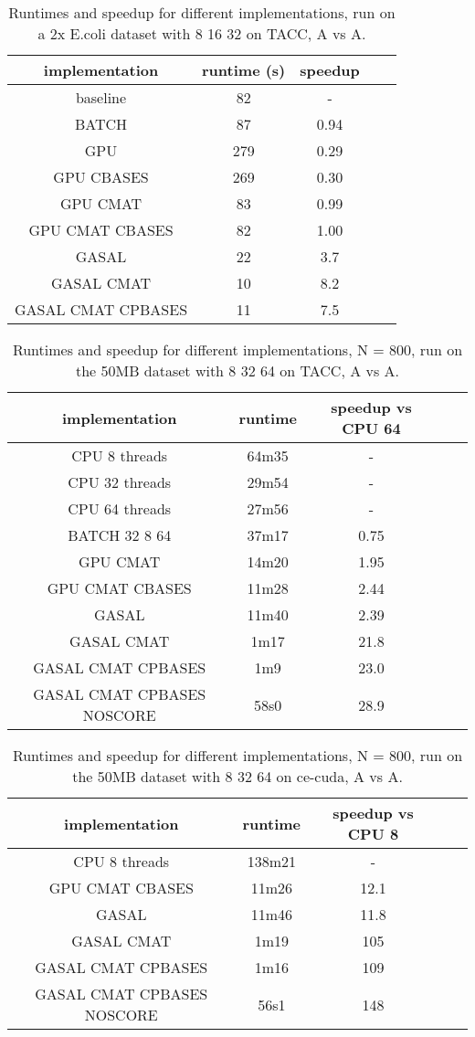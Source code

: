 \documentclass[../main/thesis.tex]{subfiles}
\begin{document}
\begin{table}
\centering
\caption{Runtimes and speedup for different implementations, run on a 2x E.coli dataset with 8 16 32 on TACC, A vs A.}
\label{tbl:darwin1}
\begin{tabular}{c c c c c}
implementation & runtime (s) & speedup \\ \hline
baseline & 82 & -\\
BATCH & 87 & 0.94 \\
GPU & 279 & 0.29 \\
GPU CBASES & 269 & 0.30 \\
GPU CMAT & 83 & 0.99 \\
GPU CMAT CBASES & 82 & 1.00 \\
GASAL & 22 & 3.7 \\
GASAL CMAT & 10 & 8.2 \\
GASAL CMAT CPBASES & 11 & 7.5 \\
\end{tabular}
\end{table}

\begin{table}
\centering
\caption{Runtimes and speedup for different implementations, N = 800, run on the 50MB dataset with 8 32 64 on TACC, A vs A.}
\label{tbl:darwin2}
\begin{tabular}{c c c c c}
implementation & runtime & speedup vs CPU 64 \\ \hline
CPU 8 threads & 64m35 & - \\
CPU 32 threads & 29m54 & - \\
CPU 64 threads & 27m56 & - \\
BATCH 32 8 64 & 37m17 & 0.75 \\
GPU CMAT & 14m20 & 1.95 \\
GPU CMAT CBASES & 11m28 & 2.44 \\
GASAL & 11m40 & 2.39 \\
GASAL CMAT & 1m17 & 21.8 \\
GASAL CMAT CPBASES & 1m9 & 23.0 \\
GASAL CMAT CPBASES NOSCORE & 58s0 & 28.9 \\
\end{tabular}
\end{table}

\begin{table}
\centering
\caption{Runtimes and speedup for different implementations, N = 800, run on the 50MB dataset with 8 32 64 on ce-cuda, A vs A.}
\label{tbl:darwin3}
\begin{tabular}{c c c c c}
implementation & runtime & speedup vs CPU 8 \\ \hline
CPU 8 threads & 138m21 & - \\
GPU CMAT CBASES & 11m26 & 12.1 \\
GASAL & 11m46 & 11.8 \\
GASAL CMAT & 1m19 & 105 \\
GASAL CMAT CPBASES & 1m16 & 109 \\
GASAL CMAT CPBASES NOSCORE & 56s1 & 148 \\
\end{tabular}
\end{table}
\end{document}
